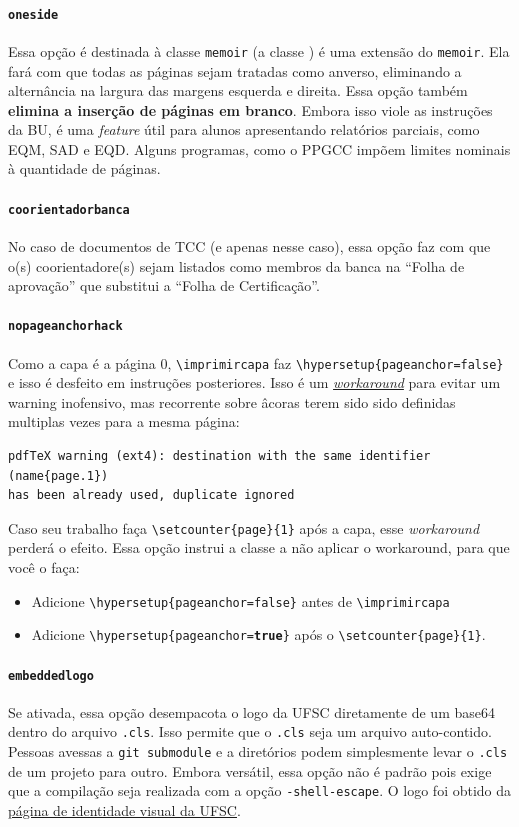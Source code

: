 \documentclass[embeddedlogo]{ufsc-thesis-rn46-2019}
\newcommand{\lacmd}[1]{\texttt{\textbackslash{}#1}}
\begin{document}
\paragraph*{\texttt{oneside}} Essa opção é destinada à classe \texttt{memoir} (a
classe \abnTeX) é uma extensão do \texttt{memoir}. Ela fará com que todas as
páginas sejam tratadas como anverso, eliminando a alternância na largura das
margens esquerda e direita. Essa opção também \textbf{elimina a inserção de
  páginas em branco}. Embora isso viole as instruções da BU, é uma \emph{feature} útil
para alunos apresentando relatórios parciais, como EQM, SAD e EQD. Alguns
programas, como o PPGCC impõem limites nominais à quantidade de páginas.

\paragraph*{\texttt{coorientadorbanca}}
No caso de documentos de TCC (e apenas nesse caso), essa opção faz com que o(s)
coorientadore(s) sejam listados como membros da banca na ``Folha de aprovação''
que substitui a ``Folha de Certificação''. 

\paragraph*{\texttt{nopageanchorhack}}
Como a capa é a página 0, \lacmd{imprimircapa} faz
\lacmd{hypersetup\{pageanchor=false\}} e isso é desfeito em instruções
posteriores. Isso é um
\href{https://tex.stackexchange.com/a/331766}{\emph{workaround}} para evitar um
warning inofensivo, mas recorrente sobre âcoras terem sido sido definidas
multiplas vezes para a mesma página:
\begin{verbatim}
pdfTeX warning (ext4): destination with the same identifier (name{page.1})
has been already used, duplicate ignored
\end{verbatim}
Caso seu trabalho faça \lacmd{setcounter\{page\}\{1\}} após a capa, esse
\emph{workaround} perderá o efeito. Essa opção instrui a classe a não aplicar o
workaround, para que você o faça:
\begin{itemize}
\item Adicione \lacmd{hypersetup\{pageanchor=false\}} antes de \lacmd{imprimircapa}
\item Adicione \lacmd{hypersetup\{pageanchor=\textbf{true}\}} após o
      \lacmd{setcounter\{page\}\{1\}}.
\end{itemize}

\paragraph*{\texttt{embeddedlogo}} Se ativada, essa opção desempacota o logo da
UFSC diretamente de um base64 dentro do arquivo \texttt{.cls}. Isso permite que
o \texttt{.cls} seja um arquivo auto-contido. Pessoas avessas a \texttt{git
  submodule} e a diretórios podem simplesmente levar o \texttt{.cls} de um
projeto para outro. Embora versátil, essa opção não é padrão pois exige que a
compilação seja realizada com a opção \texttt{-shell-escape}. O logo foi obtido
da \href{http://identidade.ufsc.br/}{página de identidade visual da UFSC}. 
\end{document}
